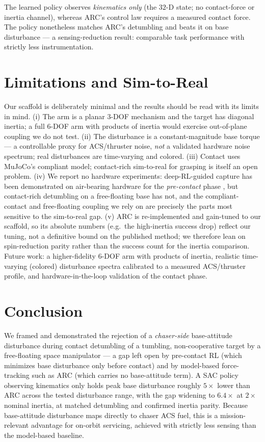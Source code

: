 \documentclass[conference]{IEEEtran}
\begin{document}
The learned policy observes \emph{kinematics only} (the $32$-D state; no contact-force or inertia
channel), whereas ARC's control law requires a measured contact force. The policy nonetheless matches
ARC's detumbling and beats it on base disturbance --- a sensing-reduction result: comparable task
performance with strictly less instrumentation.

\section{Limitations and Sim-to-Real}
Our scaffold is deliberately minimal and the results should be read with its limits in mind. (i) The
arm is a planar $3$-DOF mechanism and the target has diagonal inertia; a full $6$-DOF arm with
products of inertia would exercise out-of-plane coupling we do not test. (ii) The disturbance is a
constant-magnitude base torque --- a controllable proxy for ACS/thruster noise, \emph{not} a
validated hardware noise spectrum; real disturbances are time-varying and colored. (iii) Contact uses
MuJoCo's compliant model; contact-rich sim-to-real for grasping is itself an open problem. (iv) We
report no hardware experiments: deep-RL-guided capture has been demonstrated on air-bearing hardware
for the \emph{pre-contact} phase \cite{hovell2021lab}, but contact-rich detumbling on a free-floating
base has not, and the compliant-contact and free-floating coupling we rely on are precisely the parts
most sensitive to the sim-to-real gap. (v) ARC is re-implemented and gain-tuned to our scaffold, so
its absolute numbers (e.g.\ the high-inertia success drop) reflect our tuning, not a definitive bound
on the published method; we therefore lean on spin-reduction parity rather than the success count for
the inertia comparison. Future work: a higher-fidelity $6$-DOF arm with products of inertia, realistic
time-varying (colored) disturbance spectra calibrated to a measured ACS/thruster profile, and
hardware-in-the-loop validation of the contact phase.

\section{Conclusion}
We framed and demonstrated the rejection of a \emph{chaser-side} base-attitude disturbance during
contact detumbling of a tumbling, non-cooperative target by a free-floating space manipulator --- a
gap left open by pre-contact RL (which minimizes base disturbance only before contact) and by
model-based force-tracking such as ARC (which carries no base-attitude term). A SAC policy observing
kinematics only holds peak base disturbance roughly $5\times$ lower than ARC across the tested
disturbance range, with the gap widening to $6.4\times$ at $2\times$ nominal inertia, at matched
detumbling and confirmed inertia parity. Because base-attitude disturbance maps directly to chaser
ACS fuel, this is a mission-relevant advantage for on-orbit servicing, achieved with strictly less
sensing than the model-based baseline.
\end{document}
